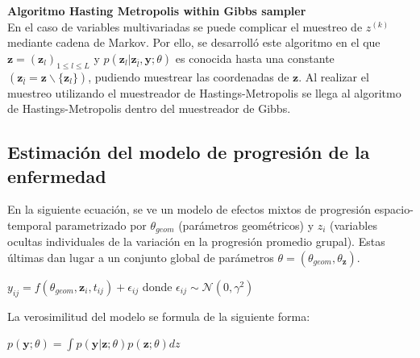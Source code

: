 \begin{description}
		\item {\textbf{Algoritmo Hasting Metropolis within Gibbs sampler }}\\
		En el caso de variables multivariadas se puede complicar el muestreo de $z^{(k)}$ mediante cadena de Markov. Por ello, se desarrolló este algoritmo en el que $\mathbf{z}=(\mathbf{z}_{l})_{1\leq l\leq L}$ y $p(\mathbf{z}_{l}|\mathbf{z}_{\bar{l}}, \mathbf{y};\theta)$ es conocida hasta una constante $(\mathbf{z}_{\bar{l}}=\mathbf{z} \backslash \{{\mathbf{z}_{l}}\})$, pudiendo muestrear las coordenadas de $\mathbf{z}$. Al realizar el muestreo utilizando el muestreador de Hastings-Metropolis se llega al algoritmo de Hastings-Metropolis dentro del muestreador de Gibbs.
	\end{description}
	
	\subsection{Estimación del modelo de progresión de la enfermedad}
	En la siguiente ecuación, se ve un modelo de efectos mixtos de progresión espacio-temporal parametrizado por $\theta_{geom}$ (parámetros geométricos) y $z_{i}$ (variables ocultas individuales de la variación en la progresión promedio grupal). Estas últimas dan lugar a un conjunto global de parámetros $\theta=(\theta_{geom}, \theta_{\mathbf{z}})$.
	\begin{center}
		$y_{ij}=f(\theta_{geom},\mathbf{z}_{i},t_{ij})+\epsilon_{ij}$ donde $\epsilon_{ij} \sim \mathcal{N}(0, \gamma^{2})$
	\end{center}
	
	La verosimilitud del modelo se formula de la siguiente forma:
	\begin{center}
		$p(\mathbf{y};\theta) = \int p(\mathbf{y}|\mathbf{z};\theta)p(\mathbf{z};\theta)dz$
	\end{center}
	
